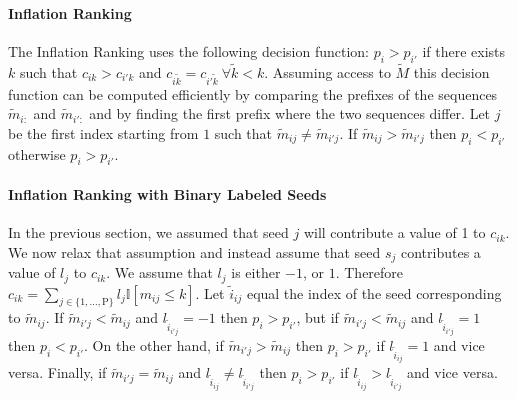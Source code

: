 \documentclass[14pt]{article}
\newcommand{\tk}[0]{\tilde{k}}
\newcommand{\tM}[0]{\tilde{M}}
\newcommand{\tm}[0]{\tilde{m}}
\newcommand{\rmP}[0]{\mathrm{P}}
\newcommand{\ti}[0]{\tilde{i}}
\begin{document}
\paragraph{Inflation Ranking}
The Inflation Ranking uses the following decision function:
$p_{i} > p_{i'}$ if there exists $k$ such that $c_{ik} > c_{i'k}$ and
$c_{i\tk} = c_{i'\tk}\ \forall \tk < k$. Assuming access to $\tM$ this
decision function can be computed efficiently by comparing the prefixes of
the sequences $\tm_{i:}$ and $\tm_{i':}$ and by finding the first prefix where
the two sequences differ. Let $j$ be the first index starting from $1$ such
that $\tm_{ij} \ne \tm_{i'j}$. If $\tm_{ij} > \tm_{i'j}$ then $p_{i} < p_{i'}$
otherwise $p_i > p_{i'}$.

\paragraph{Inflation Ranking with Binary Labeled Seeds}
In the previous section, we assumed that seed $j$ will contribute a value of 1 to
$c_{ik}$. We now relax that assumption and instead assume that seed $s_j$
contributes a value of $l_j$ to $c_{ik}$. We assume that $l_j$ is either $-1$,
or $1$. Therefore $c_{ik} = \sum_{j \in \{1, \ldots, \rmP\}}l_j\mathbb{I}[m_{ij} \le k]$.
Let $\ti_{ij}$ equal the index of the seed corresponding to $\tm_{ij}$.
If $\tm_{i'j} < \tm_{ij}$ and $l_{\ti_{i'j}} = -1$ then $p_i > p_{i'}$, but
if $\tm_{i'j} < \tm_{ij}$ and $l_{\ti_{i'j}} = 1$ then $p_i < p_{i'}$.
On the other hand, if $\tm_{i'j} > \tm_{ij}$ then $p_i > p_{i'}$ if $l_{\ti_{ij}} = 1$ and vice versa. Finally, if $\tm_{i'j} = \tm_{ij}$ and $l_{\ti_{ij}} \ne l_{\ti_{i'j}}$ then
$p_i > p_{i'}$ if $l_{\ti_{ij}} > l_{\ti_{i'j}}$ and vice versa.
% 
% 
\end{document}
